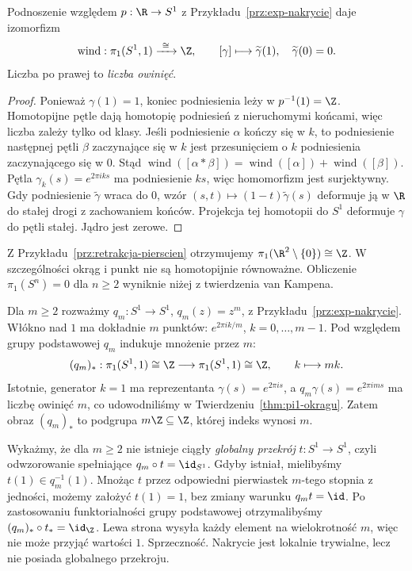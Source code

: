 \begin{twierdzenie}
\label{thm:pi1-okragu}
Podnoszenie względem $p:\R\to S^1$
z Przykładu~\ref{prz:exp-nakrycie} daje
izomorfizm
\[
 \operatorname{wind}:\pi_1(S^1,1)\xrightarrow{\ \cong\ }\Z,
 \qquad [\gamma]\longmapsto
 \widetilde\gamma(1),
 \quad \widetilde\gamma(0)=0.
\]
Liczba po prawej to \emph{liczba owinięć}.
\end{twierdzenie}
\begin{proof}
Ponieważ $\gamma(1)=1$, koniec
podniesienia leży w $p^{-1}(1)=\Z$.
Homotopijne pętle dają homotopię
podniesień z nieruchomymi końcami,
więc liczba zależy tylko od klasy.
Jeśli podniesienie $\alpha$ kończy się w $k$,
to podniesienie następnej pętli $\beta$
zaczynające się w $k$ jest przesunięciem
o $k$ podniesienia zaczynającego się w $0$.
Stąd $\operatorname{wind}([\alpha*\beta])
=\operatorname{wind}([\alpha])
+\operatorname{wind}([\beta])$.
Pętla $\gamma_k(s)=e^{2\pi i ks}$
ma podniesienie $ks$, więc homomorfizm
jest surjektywny. Gdy podniesienie
$\widetilde\gamma$ wraca do $0$,
wzór $(s,t)\mapsto(1-t)\widetilde\gamma(s)$
deformuje ją w $\R$ do stałej drogi
z zachowaniem końców. Projekcja tej
homotopii do $S^1$ deformuje $\gamma$
do pętli stałej. Jądro jest zerowe.
\end{proof}

Z Przykładu~\ref{prz:retrakcja-pierscien}
otrzymujemy $\pi_1(\R^2\setminus\{0\})\cong\Z$.
W szczególności okrąg i punkt nie są
homotopijnie równoważne. Obliczenie
$\pi_1(S^{n})=0$ dla $n\geq2$
wyniknie niżej z twierdzenia van Kampena.

\begin{przyklad}
\label{prz:nakrycie-m-arkuszy}
Dla $m\geq2$ rozważmy
$q_m:S^1\to S^1$, $q_m(z)=z^m$,
z Przykładu~\ref{prz:exp-nakrycie}.
Włókno nad $1$ ma dokładnie $m$ punktów:
$e^{2\pi i k/m}$, $k=0,\ldots,m-1$.
Pod względem grupy podstawowej
$q_m$ indukuje mnożenie przez $m$:
\[
 (q_m)_*:\pi_1(S^1,1)\cong\Z
 \longrightarrow\pi_1(S^1,1)\cong\Z,
 \qquad k\longmapsto mk.
\]
Istotnie, generator $k=1$ ma reprezentanta
$\gamma(s)=e^{2\pi i s}$, a
$q_m\gamma(s)=e^{2\pi i ms}$ ma liczbę owinięć $m$,
co udowodniliśmy w
Twierdzeniu~\ref{thm:pi1-okragu}.
Zatem obraz $(q_m)_*$ to podgrupa
$m\Z\subseteq\Z$, której indeks wynosi $m$.

Wykażmy, że dla $m\geq2$ nie istnieje
ciągły \emph{globalny przekrój}
$t:S^1\to S^1$, czyli odwzorowanie spełniające
$q_m\circ t=\id_{S^1}$.
Gdyby istniał, mielibyśmy $t(1)\in q_m^{-1}(1)$.
Mnożąc $t$ przez odpowiedni pierwiastek $m$-tego
stopnia z jedności, możemy założyć $t(1)=1$,
bez zmiany warunku $q_m t=\id$.
Po zastosowaniu funktorialności grupy podstawowej
otrzymalibyśmy
$(q_m)_*\circ t_*=\id_{\Z}$.
Lewa strona wysyła każdy element na wielokrotność $m$,
więc nie może przyjąć wartości $1$.
Sprzeczność. Nakrycie jest lokalnie trywialne,
lecz nie posiada globalnego przekroju.
\end{przyklad}

